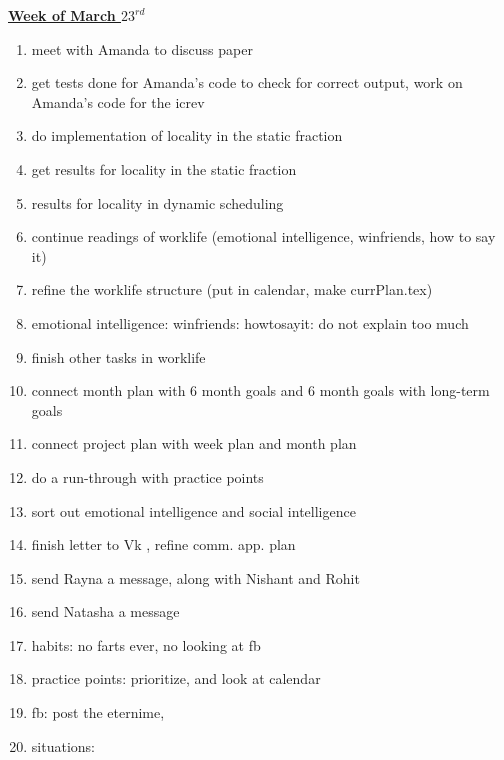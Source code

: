 \underline{\textbf{Week of March $23^{rd}$}} \\
\begin{enumerate}

\item meet with Amanda to discuss paper
\item get tests done for Amanda's code to check for correct output,  work on Amanda's code for the icrev \\

\item do implementation of locality in the static fraction
\item get results for locality in the static fraction
\item results for locality in dynamic scheduling \\

\item continue readings of worklife (emotional intelligence, winfriends, how to say it)
\item refine the worklife structure (put in calendar, make currPlan.tex)
\item emotional intelligence:  winfriends: howtosayit: do not explain too much \\

\item finish other tasks in worklife
\item connect month plan with 6 month goals and 6 month goals with long-term goals
\item connect project plan with week plan and month plan
\item do a run-through with practice points \\
\item sort out emotional intelligence and social intelligence \\

\item finish letter to Vk , refine comm. app. plan
\item send Rayna a message, along with Nishant and Rohit
\item send Natasha a message \\

\item habits: no farts ever, no looking at fb
\item practice points: prioritize, and look at calendar
\item fb: post the eternime,
\item situations:  \\

\end{enumerate}

